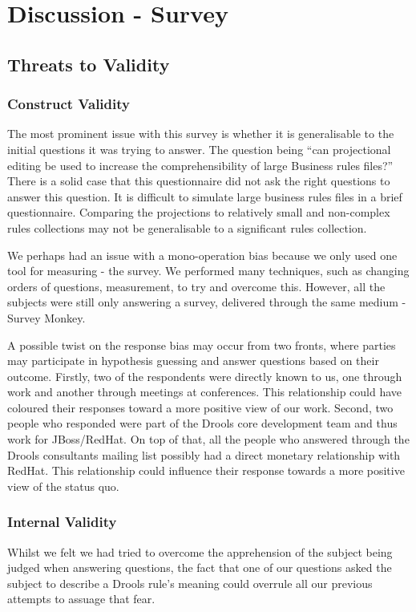 \section{Discussion - Survey}
\label{section:survey_discussion}

\subsection{Threats to Validity}  

\subsubsection{Construct Validity}
The most prominent issue with this survey is whether it is generalisable to the initial questions it was trying to answer.
The question being ``can projectional editing be used to increase the comprehensibility of large Business rules files?''
There is a solid case that this questionnaire did not ask the right questions to answer this question.
It is difficult to simulate large business rules files in a brief questionnaire.
Comparing the projections to relatively small and non-complex rules collections may not be generalisable to a significant rules collection.

We perhaps had an issue with a mono-operation bias because we only used one tool for measuring - the survey.
We performed many techniques, such as changing orders of questions, measurement, to try and overcome this.
However, all the subjects were still only answering a survey, delivered through the same medium - Survey Monkey.

A possible twist on the response bias may occur from two fronts, where parties may participate in hypothesis guessing and answer questions based on their outcome.
Firstly, two of the respondents were directly known to us, one through work and another through meetings at conferences.
This relationship could have coloured their responses toward a more positive view of our work.
Second, two people who responded were part of the Drools core development team and thus work for JBoss/RedHat.
On top of that, all the people who answered through the Drools consultants mailing list possibly had a direct monetary relationship with RedHat.
This relationship could influence their response towards a more positive view of the status quo.

\subsubsection{Internal Validity}
Whilst we felt we had tried to overcome the apprehension of the subject being judged when answering questions, the fact that one of our questions asked the subject to describe a Drools rule's meaning could overrule all our previous attempts to assuage that fear.

